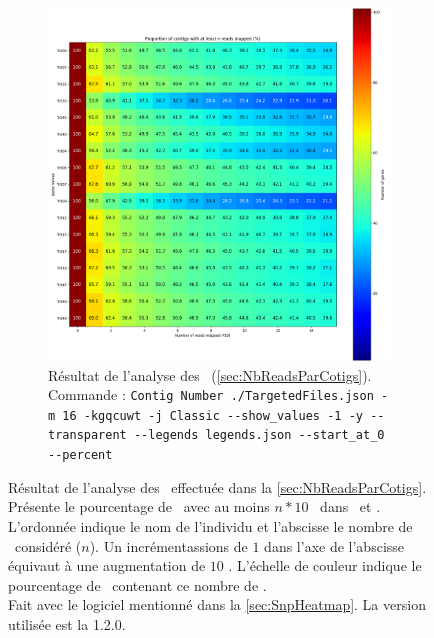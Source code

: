 \documentclass[../main]{subfiles} %
\begin{document}
\begin{landscape}
\begin{figure}[p]
\begin{subfigure}[b]{0.55\paperwidth}
        \includegraphics[width=\textwidth]{../Illustrations/Mo_Percent_Contig_Heatmap_global.png}
       \caption{Résultat de l'analyse des \BamTrMo (\ref{sec:NbReadsParCotigs}).\\
        Commande : \lstinline{Contig Number ./TargetedFiles.json -m 16 -kgqcuwt -j Classic --show_values -1 -y --transparent --legends legends.json --start_at_0 --percent}  
        }
        \label{fig:ContigsMoPercent}
    \end{subfigure}
    
    \caption{Résultat de l'analyse des \bam effectuée dans la \ref{sec:NbReadsParCotigs}. Présente le pourcentage de \contigs avec au moins $n * 10$ \reads dans \BamTrEx et \BamTrMo. L'ordonnée indique le nom de l'individu et l'abscisse le nombre de \reads considéré ($n$). Un incrémentassions de $1$ dans l'axe de l'abscisse équivaut à une augmentation de $10$ \reads. L'échelle de couleur indique le pourcentage de \contigs contenant ce nombre de \reads. \\ Fait avec le logiciel mentionné dans la \ref{sec:SnpHeatmap}. La version utilisée est la 1.2.0.}
    \label{fig:ContigPercentHeatmap}
    
\end{figure}
\end{landscape}
\restoregeometry
\end{document}

